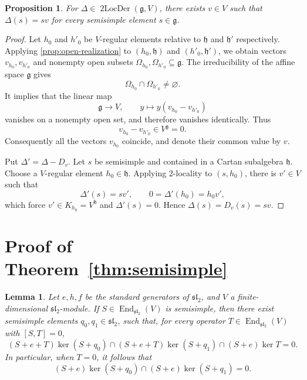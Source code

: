 \documentclass[12pt,reqno]{amsart}
\newtheorem{lemma}[theorem]{Lemma}
\newtheorem{proposition}[theorem]{Proposition}
\theoremstyle{definition}
\theoremstyle{remark}
\numberwithin{equation}{section}
\newcommand{\g}{\mathfrak{g}}
\newcommand{\h}{\mathfrak{h}}
\newcommand{\tori}{\mathfrak{h}}
\begin{document}
\begin{proposition}\label{prop:all-semisimple}
For \(\Delta\in \operatorname{2LocDer}(\g,V)\), there exists \(v\in V\) such that \(\Delta(s)=sv\) for every semisimple element \(s\in \g\).
\end{proposition}

\begin{proof}
Let \(h_0\) and \(h'_0\) be \(V\)-regular elements relative to \(\h\) and \(\h'\) respectively.
Applying \cref{prop:open-realization} to \((h_0, \h)\) and \((h'_0, \h')\), we obtain
vectors \(v_{h_0},v_{h'_0}\) and nonempty open subsets
\(\Omega_{h_0},\Omega_{h'_0}\subseteq\g\). The irreducibility of the affine space \(\g\) gives
\[
  \Omega_{h_0}\cap\Omega_{h'_0}\ne\varnothing.
\]
It implies that the linear map
\[
  \g\longrightarrow V,\qquad y\longmapsto y(v_{h_0}-v_{h'_0})
\]
vanishes on a nonempty open set, and therefore vanishes identically. 
Thus
\[
  v_{h_0}-v_{h'_0}\in V^\g=0.
\]
Consequently all the vectors \(v_{h_0}\) coincide, and denote their common
value by \(v\).

Put \(\Delta'= \Delta- D_v\). Let \(s\) be semisimple and contained in a Cartan subalgebra
\(\tori\).  Choose a \(V\)-regular element \(h_0\in\tori\).
Applying 2-locality to \((s,h_0)\), there is \(v'\in V\) such that
\[
  \Delta'(s)=sv',\qquad
  0=\Delta'(h_0)=h_0 v',
\]
which force \(v'\in K_{h_0}=V^\tori\) and \(\Delta'(s)=0\). Hence \(\Delta(s)= D_v(s)= sv\).
\end{proof}

\section{Proof of Theorem~\ref{thm:semisimple}}\label{sec:proof-of-thm1.1}

\begin{lemma}\label{lem:sl2-nilpotent-separation}
Let $e,h,f$ be the standard generators of $\mathfrak{sl}_2$,
and $V$ a finite-dimensional $\mathfrak{sl}_2$-module.
If $S\in\operatorname{End}_{\mathfrak{sl}_2}(V)$ is semisimple,
then there exist semisimple elements $q_0,q_1\in\mathfrak{sl}_2$,
such that, for every operator $T\in\operatorname{End}_{\mathfrak{sl}_2}(V)$ with $[S,T]=0$,
\[
(S+e+T)\ker(S+q_0)\cap(S+e+T)\ker(S+q_1)\cap(S+e)\ker T= 0.
\]
In particular, when $T=0$, it follows that
\[
 (S+e)\ker(S+q_0)\cap(S+e)\ker(S+q_1)=0.
\]
\end{lemma}
\end{document}
